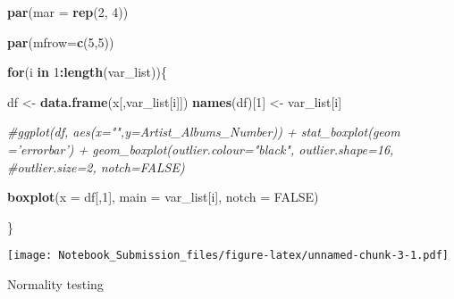 \documentclass[
]{article}
\newenvironment{Shaded}{\begin{snugshade}}{\end{snugshade}}
\newcommand{\CommentTok}[1]{\textcolor[rgb]{0.56,0.35,0.01}{\textit{#1}}}
\newcommand{\ControlFlowTok}[1]{\textcolor[rgb]{0.13,0.29,0.53}{\textbf{#1}}}
\newcommand{\DataTypeTok}[1]{\textcolor[rgb]{0.13,0.29,0.53}{#1}}
\newcommand{\DecValTok}[1]{\textcolor[rgb]{0.00,0.00,0.81}{#1}}
\newcommand{\KeywordTok}[1]{\textcolor[rgb]{0.13,0.29,0.53}{\textbf{#1}}}
\newcommand{\NormalTok}[1]{#1}
\newcommand{\OperatorTok}[1]{\textcolor[rgb]{0.81,0.36,0.00}{\textbf{#1}}}
\newcommand{\OtherTok}[1]{\textcolor[rgb]{0.56,0.35,0.01}{#1}}
\newcommand{\StringTok}[1]{\textcolor[rgb]{0.31,0.60,0.02}{#1}}
\begin{document}
\begin{Shaded}
\begin{Highlighting}[]
\KeywordTok{par}\NormalTok{(}\DataTypeTok{mar =} \KeywordTok{rep}\NormalTok{(}\DecValTok{2}\NormalTok{, }\DecValTok{4}\NormalTok{))}

\KeywordTok{par}\NormalTok{(}\DataTypeTok{mfrow=}\KeywordTok{c}\NormalTok{(}\DecValTok{5}\NormalTok{,}\DecValTok{5}\NormalTok{))}

\ControlFlowTok{for}\NormalTok{(i }\ControlFlowTok{in} \DecValTok{1}\OperatorTok{:}\KeywordTok{length}\NormalTok{(var_list))\{}
  
\NormalTok{  df <-}\StringTok{ }\KeywordTok{data.frame}\NormalTok{(x[,var_list[i]])}
  \KeywordTok{names}\NormalTok{(df)[}\DecValTok{1}\NormalTok{] <-}\StringTok{ }\NormalTok{var_list[i]}
  
  \CommentTok{#ggplot(df, aes(x="",y=Artist_Albums_Number)) + stat_boxplot(geom ='errorbar') + geom_boxplot(outlier.colour="black", outlier.shape=16, #outlier.size=2, notch=FALSE)}
  
  \KeywordTok{boxplot}\NormalTok{(}\DataTypeTok{x =}\NormalTok{ df[,}\DecValTok{1}\NormalTok{], }\DataTypeTok{main =}\NormalTok{ var_list[i], }\DataTypeTok{notch =} \OtherTok{FALSE}\NormalTok{)}

\NormalTok{\}}
\end{Highlighting}
\end{Shaded}

\texttt{[image: Notebook\_Submission\_files/figure-latex/unnamed-chunk-3-1.pdf]}

Normality testing
\end{document}
